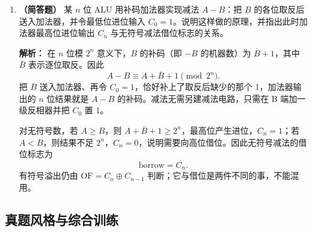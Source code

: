 \begin{enumerate}
\item \textbf{（简答题）} 某 $n$ 位 ALU 用补码加法器实现减法 $A-B$：把 $B$ 的各位取反后送入加法器，并令最低位进位输入 $C_0=1$。说明这样做的原理，并指出此时加法器最高位进位输出 $C_n$ 与无符号减法借位标志的关系。

\ifshowsolutions\par\noindent\textbf{解析：} 在 $n$ 位模 $2^n$ 意义下，$B$ 的补码（即 $-B$ 的机器数）为 $\overline{B}+1$，其中 $\overline{B}$ 表示逐位取反。因此
\[
A-B\equiv A+\overline{B}+1\pmod{2^n}.
\]
把 $\overline{B}$ 送入加法器、再令 $C_0=1$，恰好补上了取反后缺少的那个 1，加法器输出的 $n$ 位结果就是 $A-B$ 的补码。减法无需另建减法电路，只需在 B 端加一级反相器并把 $C_0$ 置 1。

对无符号数，若 $A\geqslant B$，则 $A+\overline{B}+1\geqslant 2^n$，最高位产生进位，$C_n=1$；若 $A<B$，则结果不足 $2^n$，$C_n=0$，说明需要向高位借位。因此无符号减法的借位标志为
\[
\text{borrow}=\overline{C_n}.
\]
有符号溢出仍由 $\text{OF}=C_n\oplus C_{n-1}$ 判断；它与借位是两件不同的事，不能混用。\else \answerarea \fi

\end{enumerate}

\subsection{真题风格与综合训练}

